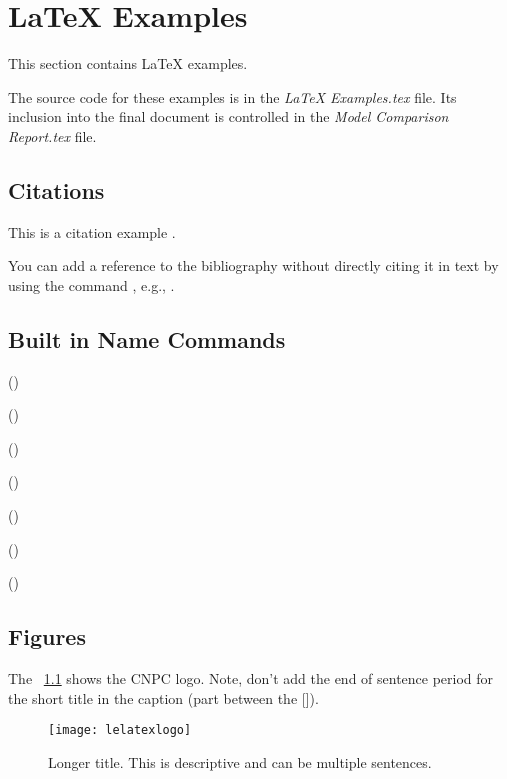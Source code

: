 \chapter{\LaTeX{} Examples}
This section contains \LaTeX{} examples.  

The source code for these examples is in the \textit{LaTeX Examples.tex} file.  Its inclusion into the final document is controlled in the \textit{Model Comparison Report.tex} file.

\section{Citations}
This is a citation example .
~\cite{ref:aarsnes2017a}

You can add a reference to the bibliography without directly citing it in text by using the command , e.g., .

\section{Built in Name Commands}
\begin{bulletedlist}
	\item \appendixname{} ()
	\item \chaptername{} ()
	\item \equationname{} ()
	\item \figurename{} ()
	\item {} ()
	\item \sectionname{} ()
	\item \tablename{} ()
\end{bulletedlist}

\section{Figures}
The \figurename~\ref{fig:lelatexlogo} shows the CNPC logo.  Note, don't add the end of sentence period for the short title in the caption (part between the []).
\begin{figure}
	\centering
	\texttt{[image: lelatexlogo]}
	\caption[Short title for list of figures]{Longer title.  This is descriptive and can be multiple sentences.}
	\label{fig:lelatexlogo}
\end{figure}

